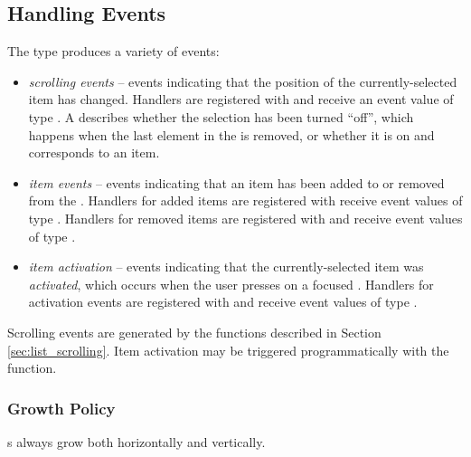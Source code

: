 \subsection{Handling Events}

The  type produces a variety of events:

\begin{itemize}
\item \textit{scrolling events} -- events indicating that the position
  of the currently-selected item has changed.  Handlers are registered
  with  and receive an event value of type
  .  A  describes whether the
  selection has been turned ``off'', which happens when the last
  element in the  is removed, or whether it is on and
  corresponds to an item.
\item \textit{item events} -- events indicating that an item has been
  added to or removed from the .  Handlers for added items
  are registered with  receive event values of type
  .  Handlers for removed items are registered with
   and receive event values of type
  .
\item \textit{item activation} -- events indicating that the
  currently-selected item was \textit{activated}, which occurs when
  the user presses  on a focused .  Handlers for
  activation events are registered with  and
  receive event values of type .
\end{itemize}

Scrolling events are generated by the functions described in Section
\ref{sec:list_scrolling}.  Item activation may be triggered
programmatically with the  function.

\subsubsection{Growth Policy}

s always grow both horizontally and vertically.
